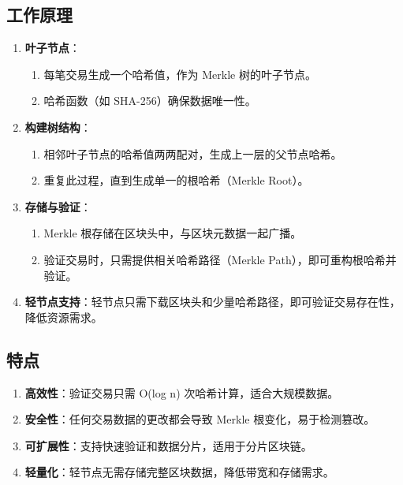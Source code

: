\documentclass[12pt]{ctexart}
\begin{document}
\subsection{工作原理}
\begin{enumerate}
    \item \textbf{叶子节点}：
        \begin{enumerate}
            \item 每笔交易生成一个哈希值，作为 Merkle 树的叶子节点。
            \item 哈希函数（如 SHA-256）确保数据唯一性。
        \end{enumerate}
    \item \textbf{构建树结构}：
        \begin{enumerate}
            \item 相邻叶子节点的哈希值两两配对，生成上一层的父节点哈希。
            \item 重复此过程，直到生成单一的根哈希（Merkle Root）。
        \end{enumerate}
    \item \textbf{存储与验证}：
        \begin{enumerate}
            \item Merkle 根存储在区块头中，与区块元数据一起广播。
            \item 验证交易时，只需提供相关哈希路径（Merkle Path），即可重构根哈希并验证。
        \end{enumerate}
    \item \textbf{轻节点支持}：轻节点只需下载区块头和少量哈希路径，即可验证交易存在性，降低资源需求。
\end{enumerate}

\subsection{特点}
\begin{enumerate}
    \item \textbf{高效性}：验证交易只需 O(log n) 次哈希计算，适合大规模数据。
    \item \textbf{安全性}：任何交易数据的更改都会导致 Merkle 根变化，易于检测篡改。
    \item \textbf{可扩展性}：支持快速验证和数据分片，适用于分片区块链。
    \item \textbf{轻量化}：轻节点无需存储完整区块数据，降低带宽和存储需求。
\end{enumerate}
\end{document}
